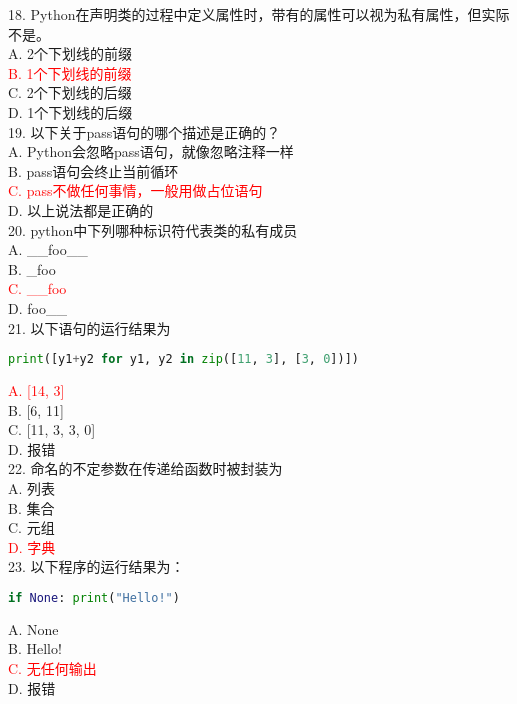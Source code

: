 \documentclass[6pt]{article}
\begin{document}
18. Python在声明类的过程中定义属性时，带有的属性可以视为私有属性，但实际不是。\\

A. 2个下划线的前缀\\
\textcolor{red}{B. 1个下划线的前缀}\\
C. 2个下划线的后缀\\
D. 1个下划线的后缀\\

19. 以下关于pass语句的哪个描述是正确的？\\

A. Python会忽略pass语句，就像忽略注释一样\\
B. pass语句会终止当前循环\\
\textcolor{red}{C. pass不做任何事情，一般用做占位语句}\\
D. 以上说法都是正确的\\

20. python中下列哪种标识符代表类的私有成员\\

A. \_\_foo\_\_\\
B. \_foo\\
\textcolor{red}{C. \_\_foo}\\
D. foo\_\_\\

21. 以下语句的运行结果为

\begin{lstlisting}[language=Python]
print([y1+y2 for y1, y2 in zip([11, 3], [3, 0])])
\end{lstlisting}
\textcolor{red}{A. [14, 3]}\\
B. [6, 11]\\
C. [11, 3, 3, 0]\\
D. 报错\\

22. 命名的不定参数在传递给函数时被封装为\\

A. 列表\\
B. 集合\\
C. 元组\\
\textcolor{red}{D. 字典}\\

23. 以下程序的运行结果为：\\

\begin{lstlisting}[language=Python]
if None: print("Hello!")
\end{lstlisting}
A. None\\
B. Hello!\\
\textcolor{red}{C. 无任何输出}\\
D. 报错\\
\end{document}
